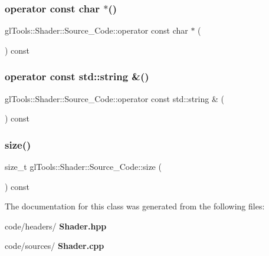 \mbox{\label{classgl_tools_1_1_shader_1_1_source___code_a4d0c01eccf7bfe958bd84bdd751e092e}} 
\subsubsection{operator const char $\ast$()}
{\footnotesize\ttfamily gl\+Tools\+::\+Shader\+::\+Source\+\_\+\+Code\+::operator const char $\ast$ (\begin{DoxyParamCaption}{ }\end{DoxyParamCaption}) const\hspace{0.3cm}{\ttfamily [inline]}}

\mbox{\label{classgl_tools_1_1_shader_1_1_source___code_a3cce1e1a752b6004123656271edaf750}} 
\subsubsection{operator const std::string \&()}
{\footnotesize\ttfamily gl\+Tools\+::\+Shader\+::\+Source\+\_\+\+Code\+::operator const std\+::string \& (\begin{DoxyParamCaption}{ }\end{DoxyParamCaption}) const\hspace{0.3cm}{\ttfamily [inline]}}

\mbox{\label{classgl_tools_1_1_shader_1_1_source___code_aa118e9201d8f736ce1466d220e36308d}} 
\subsubsection{size()}
{\footnotesize\ttfamily size\+\_\+t gl\+Tools\+::\+Shader\+::\+Source\+\_\+\+Code\+::size (\begin{DoxyParamCaption}{ }\end{DoxyParamCaption}) const\hspace{0.3cm}{\ttfamily [inline]}}



The documentation for this class was generated from the following files\+:\begin{DoxyCompactItemize}
\item 
code/headers/\textbf{ Shader.\+hpp}\item 
code/sources/\textbf{ Shader.\+cpp}\end{DoxyCompactItemize}
